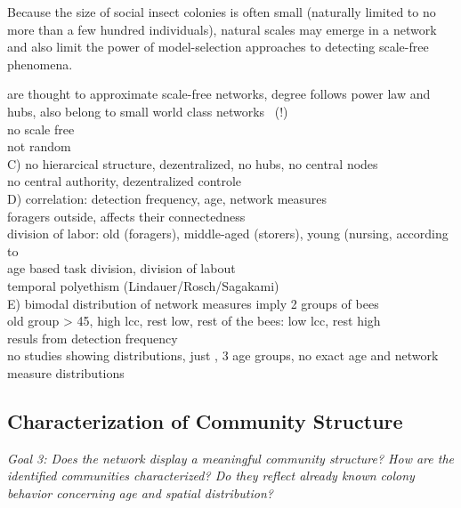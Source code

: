 Because the size of social insect
colonies is often small (naturally limited to no more than a few hundred individuals),
natural scales may emerge in a network and also limit the power of model-selection
approaches to detecting scale-free phenomena.

are thought to approximate scale-free networks, degree follows power law and hubs, also belong to small world class networks~ (!)\\

 no scale free\\ not random\\
C) no hierarcical structure, dezentralized, no hubs, no central nodes\\
no central authority, dezentralized controle~\textcite{seeley1989honey}\\

D) correlation: detection frequency, age, network measures\\
foragers outside, affects their connectedness~\textcite{baracchi2014socio}\\
division of labor: old (foragers), middle-aged (storers), young (nursing, according to \textcite{seeley1989social}\\
age based task division, division of labout\\
temporal polyethism (Lindauer/Rosch/Sagakami)\\

E) bimodal distribution of network measures imply 2 groups of bees\\
old group > 45, high lcc, rest low, rest of the bees: low lcc, rest high\\
resuls from detection frequency\\
no studies showing distributions, just \cite{baracchi2014socio}, 3 age groups, no exact age and network measure distributions\\


\subsection{Characterization of Community Structure}
\emph{Goal 3:
Does the network display a meaningful community structure?
How are the identified communities characterized?
Do they reflect already known colony behavior concerning age and spatial distribution?}

